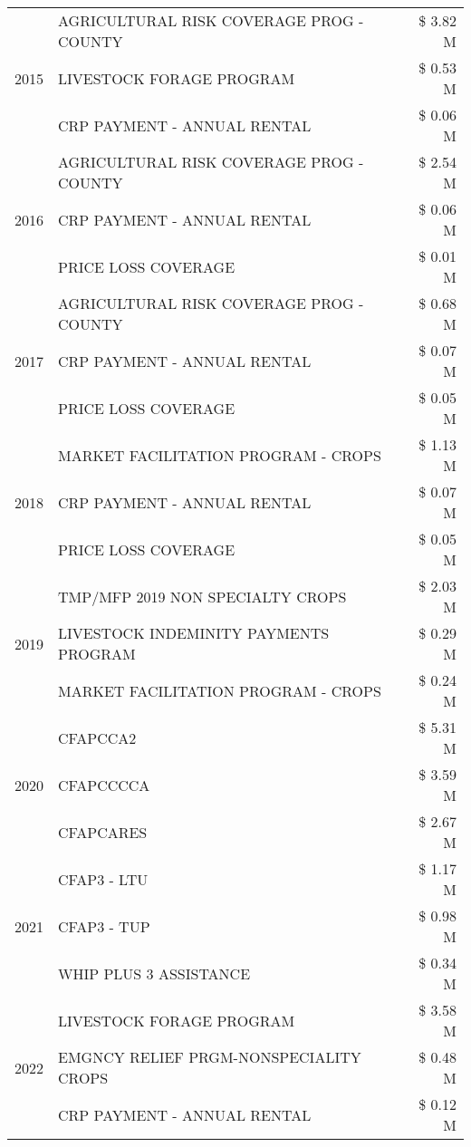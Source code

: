 \begin{tabular}{llr}
\cline{1-3}
\multirow[t]{3}{*}{2015} & AGRICULTURAL RISK COVERAGE PROG - COUNTY & \$ 3.82 M \\
 & LIVESTOCK FORAGE PROGRAM & \$ 0.53 M \\
 & CRP PAYMENT - ANNUAL RENTAL & \$ 0.06 M \\
\cline{1-3}
\multirow[t]{3}{*}{2016} & AGRICULTURAL RISK COVERAGE PROG - COUNTY & \$ 2.54 M \\
 & CRP PAYMENT - ANNUAL RENTAL & \$ 0.06 M \\
 & PRICE LOSS COVERAGE & \$ 0.01 M \\
\cline{1-3}
\multirow[t]{3}{*}{2017} & AGRICULTURAL RISK COVERAGE PROG - COUNTY & \$ 0.68 M \\
 & CRP PAYMENT - ANNUAL RENTAL & \$ 0.07 M \\
 & PRICE LOSS COVERAGE & \$ 0.05 M \\
\cline{1-3}
\multirow[t]{3}{*}{2018} & MARKET FACILITATION PROGRAM - CROPS & \$ 1.13 M \\
 & CRP PAYMENT - ANNUAL RENTAL & \$ 0.07 M \\
 & PRICE LOSS COVERAGE & \$ 0.05 M \\
\cline{1-3}
\multirow[t]{3}{*}{2019} & TMP/MFP 2019 NON SPECIALTY CROPS & \$ 2.03 M \\
 & LIVESTOCK INDEMINITY PAYMENTS PROGRAM & \$ 0.29 M \\
 & MARKET FACILITATION PROGRAM - CROPS & \$ 0.24 M \\
\cline{1-3}
\multirow[t]{3}{*}{2020} & CFAPCCA2 & \$ 5.31 M \\
 & CFAPCCCCA & \$ 3.59 M \\
 & CFAPCARES & \$ 2.67 M \\
\cline{1-3}
\multirow[t]{3}{*}{2021} & CFAP3 - LTU & \$ 1.17 M \\
 & CFAP3 - TUP & \$ 0.98 M \\
 & WHIP PLUS 3 ASSISTANCE & \$ 0.34 M \\
\cline{1-3}
\multirow[t]{3}{*}{2022} & LIVESTOCK FORAGE PROGRAM & \$ 3.58 M \\
 & EMGNCY RELIEF PRGM-NONSPECIALITY CROPS & \$ 0.48 M \\
 & CRP PAYMENT - ANNUAL RENTAL & \$ 0.12 M \\
\cline{1-3}
\bottomrule
\end{tabular}
